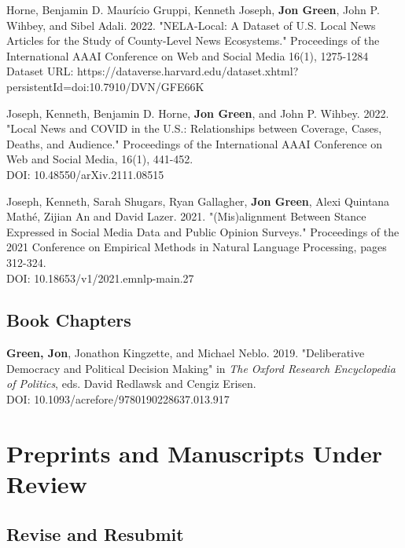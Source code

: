 \documentclass[letterpaper]{article}
\begin{document}
\begin{etaremune}
\item Horne, Benjamin D. Maur\'{i}cio Gruppi, Kenneth Joseph, \textbf{Jon Green}, John P. Wihbey, and Sibel Adali. 2022. "NELA-Local: A Dataset of U.S. Local News Articles for the Study of County-Level News Ecosystems." Proceedings of the International AAAI Conference on Web and Social Media 16(1), 1275-1284\\
Dataset URL: https://dataverse.harvard.edu/dataset.xhtml?persistentId=doi:10.7910/DVN/GFE66K

\item Joseph, Kenneth, Benjamin D. Horne, \textbf{Jon Green}, and John P. Wihbey. 2022. "Local News and COVID in the U.S.: Relationships between Coverage, Cases, Deaths, and Audience." Proceedings of the International AAAI Conference on Web and Social Media, 16(1), 441-452.\\
DOI: 10.48550/arXiv.2111.08515

\item Joseph, Kenneth, Sarah Shugars, Ryan Gallagher, \textbf{Jon Green}, Alexi Quintana Mathé, Zijian An and David Lazer. 2021. "(Mis)alignment Between Stance Expressed in Social Media Data and Public Opinion Surveys." Proceedings of the 2021 Conference on Empirical Methods in Natural Language Processing, pages 312-324. \\
DOI: 10.18653/v1/2021.emnlp-main.27
\end{etaremune}

\subsection*{Book Chapters}

\begin{etaremune}
\item \textbf{Green, Jon}, Jonathon Kingzette, and Michael Neblo. 2019. "Deliberative Democracy and Political Decision Making" in \textit{The Oxford Research Encyclopedia of Politics}, eds. David Redlawsk and Cengiz Erisen.\\
DOI: 10.1093/acrefore/9780190228637.013.917
\end{etaremune}

\section*{Preprints and Manuscripts Under Review}

\subsection*{Revise and Resubmit}
\end{document}
